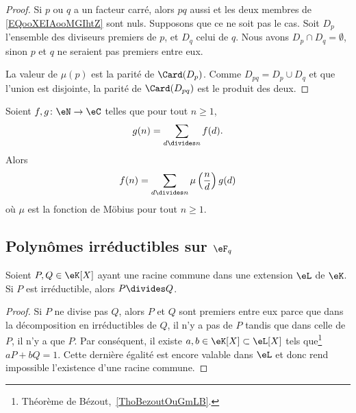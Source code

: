 \begin{proof}
	Si \( p\) ou \( q\) a un facteur carré, alors \( pq\) aussi et les deux membres de \eqref{EQooXEIAooMGIhtZ} sont nuls. Supposons que ce ne soit pas le cas. Soit \( D_p\) l'ensemble des diviseurs premiers de \( p\), et \( D_q\) celui de \( q\). Nous avons \( D_p\cap D_q=\emptyset\), sinon \( p\) et \( q\) ne seraient pas premiers entre eux.

	La valeur de \( \mu(p)\) est la parité de \( \Card(D_p)\). Comme \( D_{pq}=D_p\cup D_q\) et que l'union est disjointe, la parité de \( \Card(D_{pq})\) est le produit des deux.
\end{proof}

\begin{proposition}    \label{PropLBZoIoO}
	Soient \( f,g\colon \eN\to \eC\) telles que pour tout \( n\geq 1\),
	\begin{equation}
		g(n)=\sum_{d\divides n}f(d).
	\end{equation}
	Alors
	\begin{equation}
		f(n)=\sum_{d\divides n}\mu\left( \frac{ n }{ d } \right)g(d)
	\end{equation}
	où \( \mu\) est la fonction de Möbius pour tout \( n\geq 1\).
\end{proposition}


\subsection{Polynômes irréductibles sur \( \eF_q\)}



\begin{lemma}   \label{LemRGuWqNu}
	Soient \( P,Q\in \eK[X]\) ayant une racine commune dans une extension \( \eL\) de \( \eK\). Si \( P\) est irréductible, alors \( P\divides Q\).
\end{lemma}

\begin{proof}
	Si \( P\) ne divise pas \( Q\), alors \( P\) et \( Q\) sont premiers entre eux parce que dans la décomposition en irréductibles de \( Q\), il n'y a pas de \( P\) tandis que dans celle de \( P\), il n'y a que \( P\). Par conséquent, il existe \( a,b\in \eK[X]\subset\eL[X]\) tels que\footnote{Théorème de Bézout,~\ref{ThoBezoutOuGmLB}.} \( aP+bQ=1\). Cette dernière égalité est encore valable dans \( \eL\) et donc rend impossible l'existence d'une racine commune.
\end{proof}

